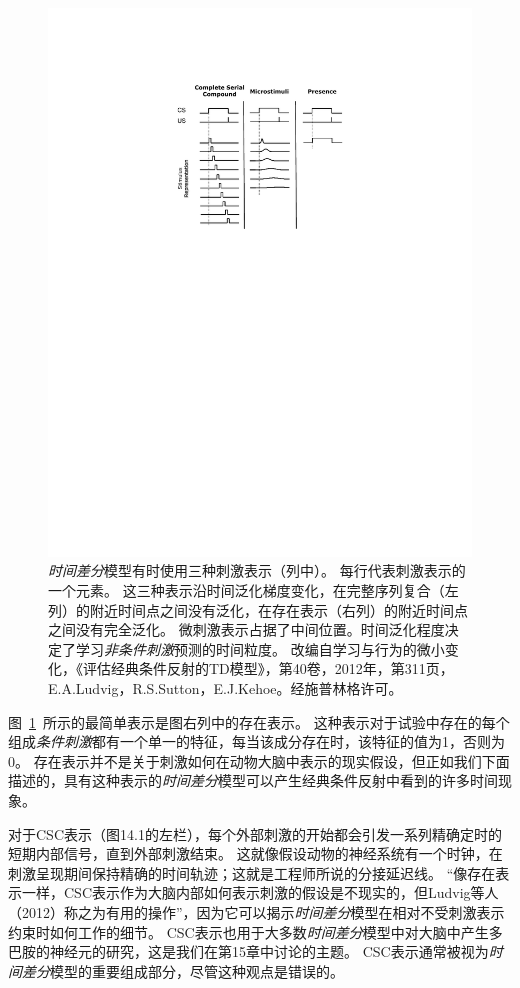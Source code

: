 \begin{figure}[!htb]
	\centering
	\includegraphics[width=0.5\linewidth]{chap11/fig_11_1}
	\caption{\textit{时间差分}模型有时使用三种刺激表示（列中）。
		每行代表刺激表示的一个元素。
		这三种表示沿时间泛化梯度变化，在完整序列复合（左列）的附近时间点之间没有泛化，在存在表示（右列）的附近时间点之间没有完全泛化。
		微刺激表示占据了中间位置。时间泛化程度决定了学习\textit{非条件刺激}预测的时间粒度。
		改编自学习与行为的微小变化，《评估经典条件反射的TD模型》，第40卷，2012年，第311页，E.A.Ludvig，R.S.Sutton，E.J.Kehoe。经施普林格许可。  \label{fig:11_1}}
\end{figure}

图~\ref{fig:11_1}~所示的最简单表示是图右列中的存在表示。
这种表示对于试验中存在的每个组成\textit{条件刺激}都有一个单一的特征，每当该成分存在时，该特征的值为1，否则为0。
存在表示并不是关于刺激如何在动物大脑中表示的现实假设，但正如我们下面描述的，具有这种表示的\textit{时间差分}模型可以产生经典条件反射中看到的许多时间现象。


对于CSC表示（图14.1的左栏），每个外部刺激的开始都会引发一系列精确定时的短期内部信号，直到外部刺激结束。
这就像假设动物的神经系统有一个时钟，在刺激呈现期间保持精确的时间轨迹；这就是工程师所说的分接延迟线。
“像存在表示一样，CSC表示作为大脑内部如何表示刺激的假设是不现实的，但Ludvig等人（2012）称之为有用的操作”，因为它可以揭示\textit{时间差分}模型在相对不受刺激表示约束时如何工作的细节。
CSC表示也用于大多数\textit{时间差分}模型中对大脑中产生多巴胺的神经元的研究，这是我们在第15章中讨论的主题。
CSC表示通常被视为\textit{时间差分}模型的重要组成部分，尽管这种观点是错误的。



